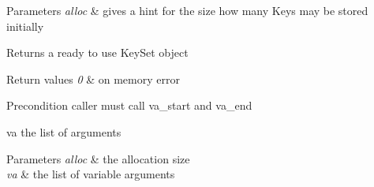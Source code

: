 \begin{DoxyParams}{Parameters}
{\em alloc} & gives a hint for the size how many Keys may be stored initially \\
\hline
\end{DoxyParams}
\begin{DoxyReturn}{Returns}
a ready to use Key\+Set object 
\end{DoxyReturn}

\begin{DoxyRetVals}{Return values}
{\em 0} & on memory error\\
\hline
\end{DoxyRetVals}
\begin{DoxyPrecond}{Precondition}
caller must call va\+\_\+start and va\+\_\+end 
\end{DoxyPrecond}
\begin{DoxyParagraph}{va the list of arguments}

\end{DoxyParagraph}

\begin{DoxyParams}{Parameters}
{\em alloc} & the allocation size \\
\hline
{\em va} & the list of variable arguments \\
\hline
\end{DoxyParams}
